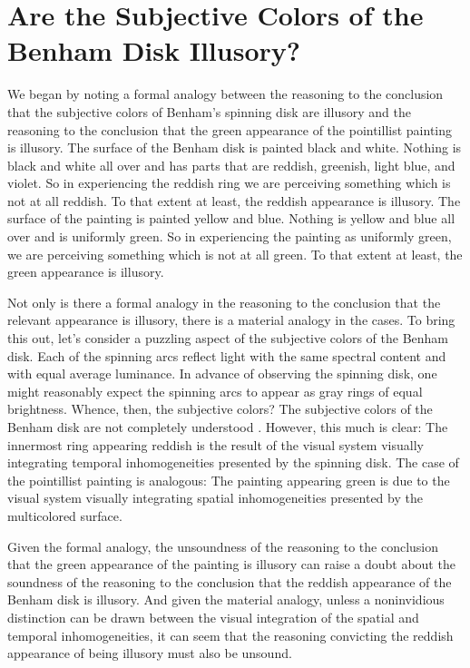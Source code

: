 \documentclass[12pt]{article}
\begin{document}


\section{Are the Subjective Colors of the Benham Disk Illusory?}\label{sec:are_the_subjective_colors_of_the_benham_disk_illusory_} %

We began by noting a formal analogy between the reasoning to the conclusion that the subjective colors of Benham's spinning disk are illusory and the reasoning to the conclusion that the green appearance of the pointillist painting is illusory. The surface of the Benham disk is painted black and white. Nothing is black and white all over and has parts that are reddish, greenish, light blue, and violet. So in experiencing the reddish ring we are perceiving something which is not at all reddish. To that extent at least, the reddish appearance is illusory. The surface of the painting is painted yellow and blue. Nothing is yellow and blue all over and is uniformly green. So in experiencing the painting as uniformly green, we are perceiving something which is not at all green. To that extent at least, the green appearance is illusory. 

Not only is there a formal analogy in the reasoning to the conclusion that the relevant appearance is illusory, there is a material analogy in the cases. To bring this out, let's consider a puzzling aspect of the subjective colors of the Benham disk. Each of the spinning arcs reflect light with the same spectral content and with equal average luminance. In advance of observing the spinning disk, one might reasonably expect the spinning arcs to appear as gray rings of equal brightness. Whence, then, the subjective colors? The subjective colors of the Benham disk are not completely understood \citep[for a review of some of the color science see][]{Campenhausen:1995yq}. However, this much is clear: The innermost ring appearing reddish is the result of the visual system visually integrating temporal inhomogeneities presented by the spinning disk. The case of the pointillist painting is analogous: The painting appearing green is due to the visual system visually integrating spatial inhomogeneities presented by the multicolored surface. 

Given the formal analogy, the unsoundness of the reasoning to the conclusion that the green appearance of the painting is illusory can raise a doubt about the soundness of the reasoning to the conclusion that the reddish appearance of the Benham disk is illusory. And given the material analogy, unless a noninvidious distinction can be drawn between the visual integration of the spatial and temporal inhomogeneities, it can seem that the reasoning convicting the reddish appearance of being illusory must also be unsound. 
\end{document}
